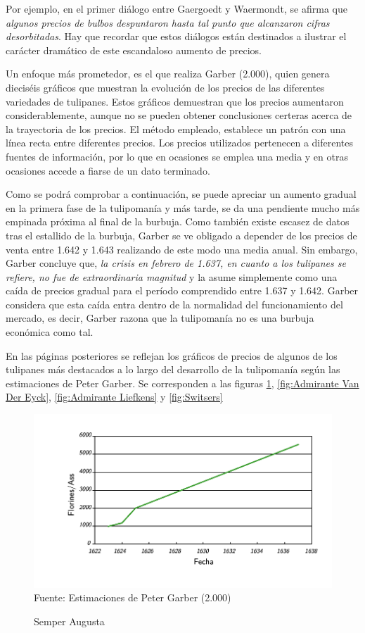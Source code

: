 Por ejemplo, en el primer diálogo entre Gaergoedt y Waermondt, se afirma que \emph{algunos precios de bulbos despuntaron hasta tal punto que alcanzaron cifras desorbitadas}. Hay que recordar que estos diálogos están destinados a ilustrar el carácter dramático de este escandaloso aumento de precios.

Un enfoque más prometedor, es el que realiza Garber (2.000), quien genera dieciséis gráficos que muestran la evolución de los precios de las diferentes variedades de tulipanes. Estos gráficos demuestran que los precios aumentaron considerablemente, aunque no se pueden obtener conclusiones certeras acerca de la trayectoria de los precios. El método empleado, establece un patrón con una línea recta entre diferentes precios. Los precios utilizados pertenecen a diferentes fuentes de información, por lo que en ocasiones se emplea una media y en otras ocasiones accede a fiarse de un dato terminado.

Como se podrá comprobar a continuación, se puede apreciar un aumento gradual en la primera fase de la tulipomanía y más tarde, se da una pendiente mucho más empinada próxima al final de la burbuja. Como también existe escasez de datos tras el estallido de la burbuja, Garber se ve obligado a depender de los precios de venta entre 1.642 y 1.643 realizando de este modo una media anual. Sin embargo, Garber concluye que, \emph{la crisis en febrero de 1.637, en cuanto a los tulipanes se refiere, no fue de extraordinaria magnitud} y la asume simplemente como una caída de precios gradual para el período comprendido entre 1.637 y 1.642. Garber considera que esta caída entra dentro de la normalidad del funcionamiento del mercado, es decir, Garber razona que la tulipomanía no es una burbuja económica como tal.

En las páginas posteriores se reflejan los gráficos de precios de algunos de los tulipanes más destacados a lo largo del desarrollo de la tulipomanía según las estimaciones de Peter Garber. Se corresponden a las figuras \ref{fig:Semper Augusta}, \ref{fig:Admirante Van Der Eyck}, \ref{fig:Admirante Liefkens} y \ref{fig:Switsers}


\begin{figure}[!h] 
\caption{Semper Augusta} 
\centering \includegraphics[width=150mm]{capitulos/graficos/SemperAugusta} 
\label{fig:Semper Augusta} 
	\footnotesize
	Fuente: Estimaciones de Peter Garber (2.000)
\end{figure}

